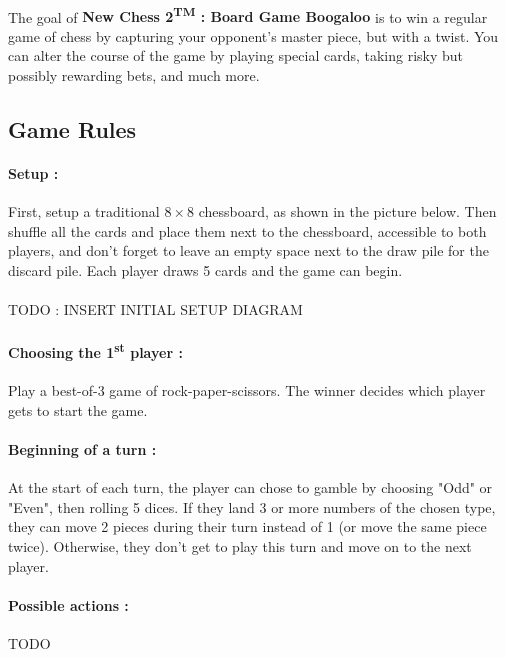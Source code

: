 \documentclass[12pt]{article}
\begin{document}
            \paragraph{}
                The goal of \textbf{New Chess 2\textsuperscript{TM} : Board Game Boogaloo} is to win a regular game of chess by capturing your opponent's master piece, but with a twist. You can alter the course of the game by playing special cards, taking risky but possibly rewarding bets, and much more.
        \subsection{Game Rules}
            \paragraph{Setup :\\}
                First, setup a traditional $8\times8$ chessboard, as shown in the picture below. Then shuffle all the cards and place them next to the chessboard, accessible to both players, and don't forget to leave an empty space next to the draw pile for the discard pile. Each player draws 5 cards and the game can begin.
            \paragraph{}
                \centerline{TODO : INSERT INITIAL SETUP DIAGRAM}
            \paragraph{Choosing the 1\textsuperscript{st} player :\\}
                Play a best-of-3 game of rock-paper-scissors. The winner decides which player gets to start the game.
            \paragraph{Beginning of a turn :\\}
                At the start of each turn, the player can chose to gamble by choosing "Odd" or "Even", then rolling 5 dices. If they land 3 or more numbers of the chosen type, they can move 2 pieces during their turn instead of 1 (or move the same piece twice). Otherwise, they don't get to play this turn and move on to the next player.
            \paragraph{Possible actions :\\}
                TODO
\end{document}
